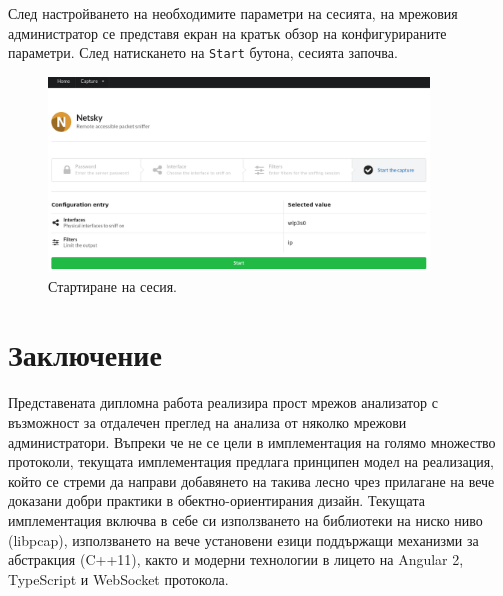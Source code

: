 \documentclass[12pt,a4paper,oneside]{book}
\begin{document}
След настройването на необходимите параметри на сесията, на мрежовия
администратор се представя екран на кратък обзор на конфигурираните параметри.
След натискането на \texttt{Start} бутона, сесията започва.

\begin{figure}[h!]
  \centering
  \includegraphics[width=0.9\textwidth]{figures/screenshots/start.png}
  \caption{Стартиране на сесия.}
  \label{screenshots_start_fig}
\end{figure}

\chapter{Заключение}

Представената дипломна работа реализира прост мрежов анализатор с възможност за
отдалечен преглед на анализа от няколко мрежови администратори. Въпреки че не
се цели в имплементация на голямо множество протоколи, текущата
имплементация предлага принципен модел на реализация, който се стреми да направи
добавянето на такива лесно чрез прилагане на вече доказани добри практики в
обектно-ориентирания дизайн.  Текущата имплементация включва в себе си
използването на библиотеки на
ниско ниво (libpcap), използването на вече установени езици поддържащи механизми
за абстракция (C++11), както и модерни технологии в лицето на
Angular 2, TypeScript и WebSocket протокола.

%



\listoffigures
\listoftables

\printindex
\end{document}
